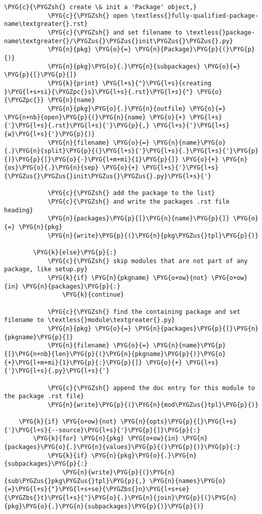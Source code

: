 \begin{Verbatim}[commandchars=\\\{\}]
            \PYG{c}{\PYGZsh{} create \& init a 'Package' object,}
            \PYG{c}{\PYGZsh{} open \textless{}fully-qualified-package-name\textgreater{}.rst}
            \PYG{c}{\PYGZsh{} and set filename to \textless{}package-name\textgreater{}/\PYGZus{}\PYGZus{}init\PYGZus{}\PYGZus{}.py}
            \PYG{n}{pkg} \PYG{o}{=} \PYG{n}{Package}\PYG{p}{(}\PYG{p}{)}
            \PYG{n}{pkg}\PYG{o}{.}\PYG{n}{subpackages} \PYG{o}{=} \PYG{p}{[}\PYG{p}{]}
            \PYG{k}{print} \PYG{l+s}{"}\PYG{l+s}{creating }\PYG{l+s+si}{\PYGZpc{}s}\PYG{l+s}{.rst}\PYG{l+s}{"} \PYG{o}{\PYGZpc{}} \PYG{n}{name}
            \PYG{n}{pkg}\PYG{o}{.}\PYG{n}{outfile} \PYG{o}{=} \PYG{n+nb}{open}\PYG{p}{(}\PYG{n}{name} \PYG{o}{+} \PYG{l+s}{'}\PYG{l+s}{.rst}\PYG{l+s}{'}\PYG{p}{,} \PYG{l+s}{'}\PYG{l+s}{w}\PYG{l+s}{'}\PYG{p}{)}
            \PYG{n}{filename} \PYG{o}{=} \PYG{n}{name}\PYG{o}{.}\PYG{n}{split}\PYG{p}{(}\PYG{l+s}{'}\PYG{l+s}{.}\PYG{l+s}{'}\PYG{p}{)}\PYG{p}{[}\PYG{o}{-}\PYG{l+m+mi}{1}\PYG{p}{]} \PYG{o}{+} \PYG{n}{os}\PYG{o}{.}\PYG{n}{sep} \PYG{o}{+} \PYG{l+s}{'}\PYG{l+s}{\PYGZus{}\PYGZus{}init\PYGZus{}\PYGZus{}.py}\PYG{l+s}{'}

            \PYG{c}{\PYGZsh{} add the package to the list}
            \PYG{c}{\PYGZsh{} and write the packages .rst file heading}
            \PYG{n}{packages}\PYG{p}{[}\PYG{n}{name}\PYG{p}{]} \PYG{o}{=} \PYG{n}{pkg}
            \PYG{n}{write}\PYG{p}{(}\PYG{n}{pkg\PYGZus{}tpl}\PYG{p}{)}

        \PYG{k}{else}\PYG{p}{:}
            \PYG{c}{\PYGZsh{} skip modules that are not part of any package, like setup.py}
            \PYG{k}{if} \PYG{n}{pkgname} \PYG{o+ow}{not} \PYG{o+ow}{in} \PYG{n}{packages}\PYG{p}{:}
                \PYG{k}{continue}

            \PYG{c}{\PYGZsh{} find the containing package and set filename to \textless{}module\textgreater{}.py}
            \PYG{n}{pkg} \PYG{o}{=} \PYG{n}{packages}\PYG{p}{[}\PYG{n}{pkgname}\PYG{p}{]}
            \PYG{n}{filename} \PYG{o}{=} \PYG{n}{name}\PYG{p}{[}\PYG{n+nb}{len}\PYG{p}{(}\PYG{n}{pkgname}\PYG{p}{)}\PYG{o}{+}\PYG{l+m+mi}{1}\PYG{p}{:}\PYG{p}{]} \PYG{o}{+} \PYG{l+s}{'}\PYG{l+s}{.py}\PYG{l+s}{'}

            \PYG{c}{\PYGZsh{} append the doc entry for this module to the package .rst file}
            \PYG{n}{write}\PYG{p}{(}\PYG{n}{mod\PYGZus{}tpl}\PYG{p}{)}

    \PYG{k}{if} \PYG{o+ow}{not} \PYG{n}{opts}\PYG{p}{[}\PYG{l+s}{'}\PYG{l+s}{--source}\PYG{l+s}{'}\PYG{p}{]}\PYG{p}{:}
        \PYG{k}{for} \PYG{n}{pkg} \PYG{o+ow}{in} \PYG{n}{packages}\PYG{o}{.}\PYG{n}{values}\PYG{p}{(}\PYG{p}{)}\PYG{p}{:}
            \PYG{k}{if} \PYG{n}{pkg}\PYG{o}{.}\PYG{n}{subpackages}\PYG{p}{:}
                \PYG{n}{write}\PYG{p}{(}\PYG{n}{sub\PYGZus{}pkg\PYGZus{}tpl}\PYG{p}{,} \PYG{n}{names}\PYG{o}{=}\PYG{l+s}{"}\PYG{l+s+se}{\PYGZbs{}n}\PYG{l+s+se}{\PYGZbs{}t}\PYG{l+s}{"}\PYG{o}{.}\PYG{n}{join}\PYG{p}{(}\PYG{n}{pkg}\PYG{o}{.}\PYG{n}{subpackages}\PYG{p}{)}\PYG{p}{)}


\end{Verbatim}
